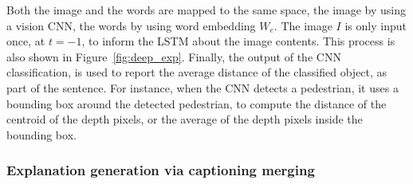Both the image and the words are mapped to the same space, the image by using a vision CNN, the words by using word embedding $W_e$.
The image $I$ is only input once, at $t = -1$, to inform the LSTM about the image contents. This process is also shown in Figure~\ref{fig:deep_exp}.
Finally, the output of the CNN classification, is used to report the average distance of the classified object, as part of the sentence. For instance, when the CNN detects a pedestrian, it uses a bounding box around the detected pedestrian, to compute the distance of the centroid of the depth pixels, or the average of the depth pixels inside the bounding box. 

\subsubsection{Explanation generation via captioning merging}
\label{subsec:explain}

